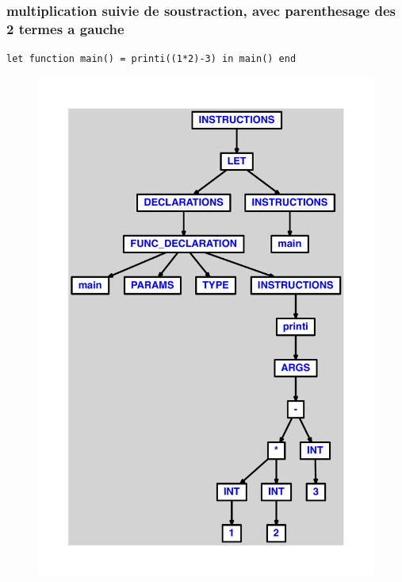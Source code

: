 \documentclass{article}
\begin{document}
\subsubsection{multiplication suivie de soustraction, avec parenthesage des 2 termes a gauche}
\begin{lstlisting}
let function main() = printi((1*2)-3) in main() end
\end{lstlisting}
\newpage
\begin{figure}[H]
\centering
\includegraphics[max width=\textwidth]{ast/ast_100.pdf}
\end{figure}
\newpage
\end{document}
